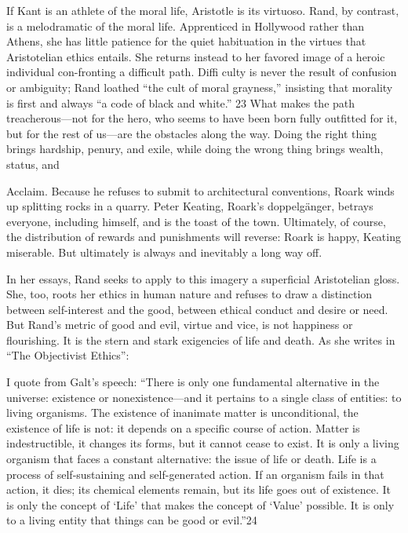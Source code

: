  \par 
If Kant is an athlete of the moral life, Aristotle is its virtuoso. Rand, by contrast, is a melodramatic of the moral life. Apprenticed in Hollywood rather than Athens, she has little patience for the quiet habituation in the virtues that Aristotelian ethics entails. She returns instead to her favored image of a heroic individual con-fronting a difficult path. Diffi culty is never the result of confusion or ambiguity; Rand loathed “the cult of moral grayness,” insisting that morality is first and always “a code of black and white.” {\color{blue}23} What makes the path treacherous—not for the hero, who seems to have been born fully outfitted for it, but for the rest of us—are the obstacles along the way. Doing the right thing brings hardship, penury, and exile, while doing the wrong thing brings wealth, status, and
 \par 
Acclaim. Because he refuses to submit to architectural conventions, Roark winds up splitting rocks in a quarry. Peter Keating, Roark’s doppelgänger, betrays everyone, including himself, and is the toast of the town. Ultimately, of course, the distribution of rewards and punishments will reverse: Roark is happy, Keating miserable. But ultimately is always and inevitably a long way off.
 \par 
In her essays, Rand seeks to apply to this imagery a superficial Aristotelian gloss. She, too, roots her ethics in human nature and refuses to draw a distinction between self-interest and the good, between ethical conduct and desire or need. But Rand’s metric of good and evil, virtue and vice, is not happiness or flourishing. It is the stern and stark exigencies of life and death. As she writes in “The Objectivist Ethics”:
 \par 
I quote from Galt’s speech: “There is only one fundamental alternative in the universe: existence or nonexistence—and it pertains to a single class of entities: to living organisms. The existence of inanimate matter is unconditional, the existence of life is not: it depends on a specific course of action. Matter is indestructible, it changes its forms, but it cannot cease to exist. It is only a living organism that faces a constant alternative: the issue of life or death. Life is a process of self-sustaining and self-generated action. If an organism fails in that action, it dies; its chemical elements remain, but its life goes out of existence. It is only the concept of ‘Life’ that makes the concept of ‘Value’ possible. It is only to a living entity that things can be good or evil.”{\color{blue}24}

